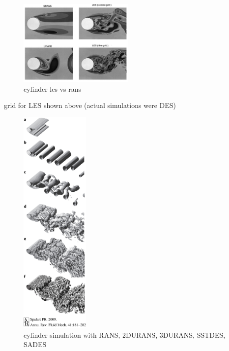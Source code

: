 \documentclass[journal]{new-aiaa}
\begin{document}
\begin{figure}[H]
\begin{center}
\includegraphics[width=0.5\textwidth]{Images/logan/spalart2000strategies_CylinderLESvsRANS.pdf}
\caption{ cylinder les vs rans \cite{spalart2000strategies} }
\label{fig:lesvsranscylinder}
\end{center}
\end{figure}


grid for LES shown above (actual simulations were DES)




\begin{figure}[H]
\begin{center}
\includegraphics[width=0.3\textwidth]{Images/logan/spalart2009detachededdy_CylinderVariousTurbModels.jpeg}
\caption{ cylinder simulation with RANS, 2DURANS, 3DURANS, SSTDES, SADES \cite{spalart2009detachededdy} }
\label{fig:cylinderturbmodels}
\end{center}
\end{figure}
\end{document}
